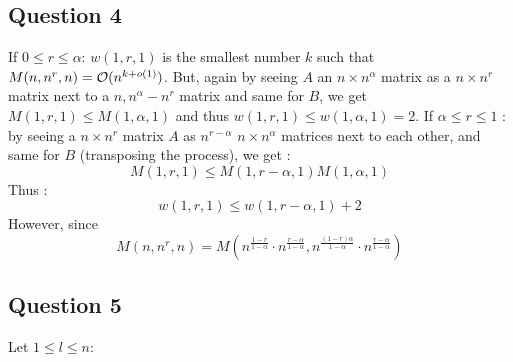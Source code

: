 \documentclass{Cours}
\begin{document}
        \subsection{Question 4}
            If $0 \leq r \leq \alpha$: $w(1, r, 1)$ is the smallest number $k$ such that $M(n, n^{r}, n) = \mathcal{O}(n^{k + o(1)})$. But, again by seeing $A$ an $n\times n^{\alpha}$ matrix as a $n\times n^{r}$ matrix next to a $n, n^{\alpha} - n^{r}$ matrix and same for $B$, we get $M(1, r, 1) \leq M(1, \alpha, 1)$ and thus $w(1, r, 1) \leq w(1, \alpha, 1) = 2$.
            If $\alpha \leq r \leq 1$ : by seeing a $n \times n^{r}$ matrix $A$ as $n^{r - \alpha}$ $n\times n^{\alpha}$ matrices next to each other, and same for $B$ (transposing the process), we get : 
            \[
                    M(1, r, 1) \leq M(1, r - \alpha, 1)M(1, \alpha, 1)
            \]
            Thus :
            \[
                    w(1, r, 1) \leq w(1, r - \alpha, 1) + 2
            \]
            However, since \[M(n, n^{r}, n) = M\left(n^{\frac{1 - r}{1 - \alpha}} \cdot n^{\frac{r - \alpha}{1 - \alpha }}, n^{\frac{\left(1 - r\right)\alpha}{1 - \alpha}}\cdot n^{\frac{r - \alpha}{1 - \alpha}}\right)\]

        \subsection{Question 5}
            Let $1 \leq l \leq n$:
\end{document}
